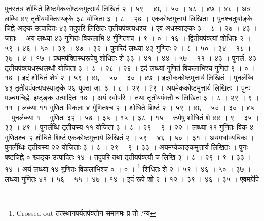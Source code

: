 \documentclass[11pt,a5paper]{book}
\begin{document}
{पुनस्तत्र शोधिते शिष्टमेककोष्टकमुत्सार्य लिखितं २ । ५९ । ४६ । ५० । ४८ । ४७ । ४८ । 
अत्र लब्धिः ४९ तृतीयपंक्तिस्थ्ङ्के ३८ योजिता ३ । ८ । २७ । एककोष्टमुत्तार्य लिखिता । 
पुनश्चतुर्थाङ्के चिह्ने अङ्क उत्पादितः ४३ तदुपरि लिखितः तृतीयपंक्त्यधश्च । 
एवं अधस्याङ्कः ३ । ८ । २७ । ४३ । जातः । अयं लब्ध्या ४३ गुणितः विकलाभि ४ र्गुणितश्च । ९ । ० । १६ । 
द्वितीयपंक्त्यां शोधितः २ । ५९ । ४६ । ५० । ३९ । ४७ । ३२ । 
पुनरिदं लब्ध्या ४३ गुणितः २ । ८ । ५० । ३४ । १८ । ३७ । ४ । १७ । 
प्रथमपंक्तिस्थरूपेषु शोधितः शे ३३ । ४१ । ४४ । ५७ । ११ । ४३ । 
पुनर्ल. ४३ तृतीयपंक्त्यधस्थलब्धौ योजिता ३ । ८ । २८ । २६ । 
इदं लब्ध्यां गुणितं विकलाभिश्च  गुणितं ९ । ० । १७ । इदं शोधितं शेषं २ । ५९ । ४६ । ५० । ३० । ४७ । 
इदमेककोष्टमुत्तार्य लिखितं । पुनर्लब्धि ४३ तृतीयपंक्त्यधस्याङ्के २६ युक्ता जा. ३ । ८ । २९ । ?९ । 
अयमेककोष्टमुत्तार्य लिखितः । पुनः पञ्चमचिह्ने. इष्ट्ङ्क उत्पादितः १७ । 
अयं स्वोपरि । तथा तृतीयपंक्तौ च लिखितः ३ । ८ । २९ । ९ । ११ । 
लब्ध्या ११ गुणितः विकला ४ र्गुणितश्च २ । शोधिते शिष्टं २ । ५९ । ४६ । ५० । ३० । ४५ । 
पुनर्लब्ध्या १ । गुणितः ३२ । ५७ । ३५ । १५ । ३८ । १५ । रूपेषु शोधितं शे ४४ । ९ । ३५ । ३३ । ४९ । 
पुनर्लब्धि तृतीयस्य ११ योजिता ३ । ८ । २९ । ९ । २२ । लब्ध्या ११ गुणितः विक ४ गुणितश्चः २ शोधिते शिष्टं एककोष्टमुत्तार्य लिखितं २ । ५९ । ४६ । ५० । ३१ । 
अयमर्धाभ्यधिकः । पुनर्लब्धिः तृतीयस्य २२ योजिताः ३ । ८ । २९ । ९ । ३३ । 
अयमप्येकाङ्कमुत्तार्य लिखितः । पुनः षष्टचिह्ने ० श्व्यङ्क उत्पादितः १४ । तदुपरि तथा तृतीयपंक्त्यौ च लिखि ३ । ८ । २९ । ९ । ३३ । १४ । 
अयं लब्ध्या १४ गुणितः विकलाभिश्च ० । ० । \footnote{Crossed out तत्स्थानपर्यतपंक्तोन समागमः प्र तो ?न्यं} शिधितः शे २ । ५९ । ४६ । ५० । ३७ । 
लब्ध्या गुणितः ४१ । ५६ । ५५ । ४७ । १४ । इदं रूपे शो २ । १२ । ३९ । ४६ । ३५ । एवमग्रेपि ।}   
\end{document}
